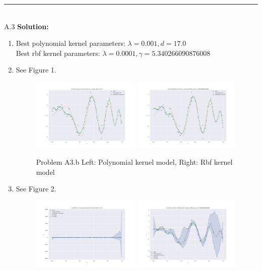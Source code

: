 \documentclass{article}
\newcommand{\1}{\mathbf{1}}
\begin{document}
\noindent\rule{\textwidth}{1pt}
\\
A.3 {\bf Solution:}\\
\begin{enumerate}
    \item Best polynomial kernel parameters: $\lambda = 0.001, d = 17.0$\\
    Best rbf kernel parameters: $\lambda = 0.0001, \gamma = 5.340266090876008$
    \item See Figure 1.
        \begin{figure}[h!]
            \centering
            \includegraphics[width=0.49\textwidth]{hw3/code/figures/A3b_poly.pdf}
            \includegraphics[width=0.49\textwidth]{hw3/code/figures/A3b_rbf.pdf}
            \caption{Problem A3.b Left: Polynomial kernel model, Right: Rbf kernel model}
            \label{figure:a4}
        \end{figure}
    \item See Figure 2.
        \begin{figure}[h!]
            \centering
            \includegraphics[width=0.49\textwidth]{hw3/code/figures/A3c_poly.pdf}
            \includegraphics[width=0.49\textwidth]{hw3/code/figures/A3c_rbf.pdf}

\end{figure}
\end{enumerate}
\end{document}

